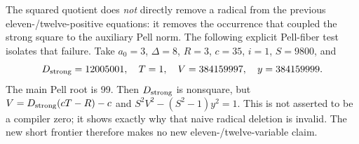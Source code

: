 The squared quotient does \emph{not} directly remove a radical from the
previous eleven-/twelve-positive equations: it removes the occurrence that
coupled the strong square to the auxiliary Pell norm. The following explicit
Pell-fiber test isolates that failure. Take $a_0=3$, $\Delta=8$, $R=3$, $c=35$, $i=1$,
$S=9800$, and
\[
 D_{\rm strong}=12005001,\quad T=1,\quad V=384159997,\quad y=384159999.
\]
The main Pell root is 99. Then $D_{\rm strong}$ is nonsquare, but
$V=D_{\rm strong}(cT-R)-c$ and
$S^2V^2-(S^2-1)y^2=1$. This is not asserted to be a compiler zero; it
shows exactly why that naive radical deletion is invalid. The new short
frontier therefore makes no new eleven-/twelve-variable claim.
